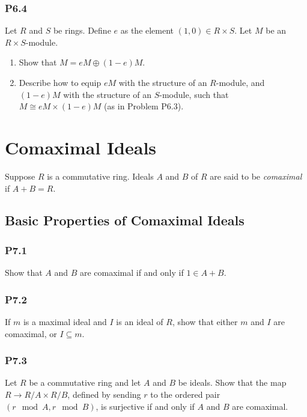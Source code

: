 \documentclass[lang=cn,11pt]{template}
\begin{document}
\subsection*{P6.4} Let \( R \) and \( S \) be rings. Define \( e \) as the element \( (1, 0) \in R \times S \). Let \( M \) be an \( R \times S \)-module.
\begin{enumerate}
    \item Show that \( M = eM \oplus (1 - e)M \).
    \item Describe how to equip \( eM \) with the structure of an \( R \)-module, and \( (1 - e)M \) with the structure of an \( S \)-module, such that \( M \cong eM \times (1 - e)M \) (as in Problem P6.3).
\end{enumerate}











\chapter{Comaximal Ideals}

\begin{definition}
Suppose \( R \) is a commutative ring. Ideals \( A \) and \( B \) of \( R \) are said to be \textit{comaximal} if \( A + B = R \).
\end{definition}

\section{Basic Properties of Comaximal Ideals}

\subsection*{P7.1} Show that \( A \) and \( B \) are comaximal if and only if \( 1 \in A + B \).

\subsection*{P7.2} If \( m \) is a maximal ideal and \( I \) is an ideal of \( R \), show that either \( m \) and \( I \) are comaximal, or \( I \subseteq m \).

\subsection*{P7.3} Let \( R \) be a commutative ring and let \( A \) and \( B \) be ideals. Show that the map \( R \to R/A \times R/B \), defined by sending \( r \) to the ordered pair \( (r \mod A, r \mod B) \), is surjective if and only if \( A \) and \( B \) are comaximal.
\end{document}
